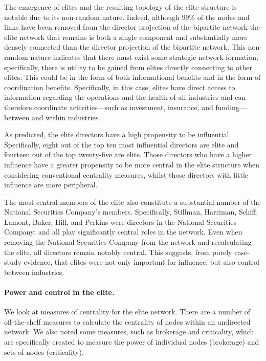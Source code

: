 The emergence of elites and the resulting topology of the elite structure is notable due to its non-random nature. Indeed, although $99\%$ of the nodes and links have been removed from the director projection of the bipartite network the elite network that remains is both a single component and substantially more densely connected than the director projection of the bipartite network. This non-random nature indicates that there must exist some strategic network formation; specifically, there is utility to be gained from elites directly connecting to other elites. This could be in the form of both informational benefits and in the form of coordination benefits. Specifically, in this case, elites have direct access to information regarding the operations and the health of all industries and can therefore coordinate activities---such as investment, insurance, and funding---between and within industries.

As predicted, the elite directors have a high propensity to be influential. Specifically, eight out of the top ten most influential directors are elite and fourteen out of the top twenty-five are elite. Those directors who have a higher influence have a greater propensity to be more central in the elite structure when considering conventional centrality measures, whilst those directors with little influence are more peripheral.

The most central members of the elite also constitute a substantial number of the National Securities Company's members. Specifically, Stillman, Harriman, Schiff, Lamont, Baker, Hill, and Perkins were directors in the National Securities Company; and all play significantly central roles in the network. Even when removing the National Securities Company from the network and recalculating the elite, all directors remain notably central. This suggests, from purely case-study evidence, that elites were not only important for influence, but also control between industries.

\paragraph{Power and control in the elite.}

We look at measures of centrality for the elite network. There are a number of off-the-shelf measures to calculate the centrality of nodes within an undirected network. We also noted some measures, such as brokerage and criticality, which are specifically created to measure the power of individual nodes (brokerage) and sets of nodes (criticality).

